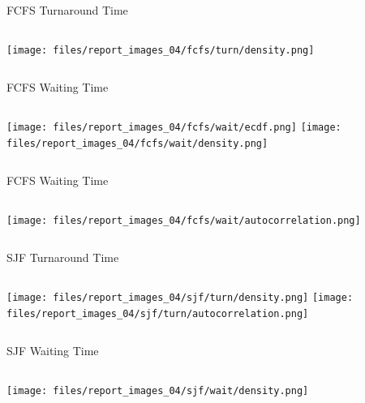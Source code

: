 \documentclass[aspectratio=169,xcolor=dvipsnames]{beamer}
\begin{document}


\begin{frame}{FCFS Turnaround Time}
    \begin{columns}[c]
        \texttt{[image: files/report\_images\_04/fcfs/turn/density.png]}
    \end{columns}
\end{frame}


\begin{frame}{FCFS Waiting Time}
    \begin{columns}[c]
        \texttt{[image: files/report\_images\_04/fcfs/wait/ecdf.png]}
        \texttt{[image: files/report\_images\_04/fcfs/wait/density.png]}
    \end{columns}
\end{frame}


\begin{frame}{FCFS Waiting Time}
    \begin{columns}[c]
        \texttt{[image: files/report\_images\_04/fcfs/wait/autocorrelation.png]}
    \end{columns}
\end{frame}


\begin{frame}{SJF Turnaround Time}
    \begin{columns}[c]
        \texttt{[image: files/report\_images\_04/sjf/turn/density.png]}
        \texttt{[image: files/report\_images\_04/sjf/turn/autocorrelation.png]}
    \end{columns}
\end{frame}


\begin{frame}{SJF Waiting Time}
    \begin{columns}[c]
        \texttt{[image: files/report\_images\_04/sjf/wait/density.png]}
    \end{columns}
\end{frame}
\end{document}
